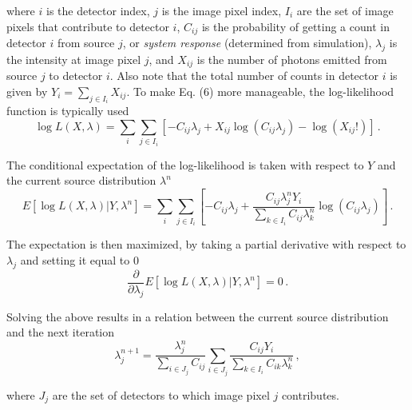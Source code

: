 \documentclass[10pt]{article}
\begin{document}
\noindent where $i$ is the detector index, $j$ is the image pixel index, $I_i$ are the set of image pixels that contribute to detector $i$, $C_{ij}$ is the probability of getting a count in detector $i$ from source $j$, or \emph{system response} (determined from simulation), $\lambda_j$ is the intensity at image pixel $j$, and $X_{ij}$ is the number of photons emitted from source $j$ to detector $i$. Also note that the total number of counts in detector $i$ is given by $Y_i=\sum_{j \in I_i} X_{ij}$. To make Eq. (6) more manageable, the log-likelihood function is typically used
%
\begin{equation} \tag{B.3}
	\log L(X,\lambda) = \sum_i \sum_{j \in I_i} \left[ -C_{ij} \lambda_j + X_{ij} \log (C_{ij} \lambda_j) - \log (X_{ij}!) \right]\,.
\end{equation}

\noindent The conditional expectation of the log-likelihood is taken with respect to $Y$ and the current source distribution $\lambda^n$
%
\begin{equation} \tag{B.4}
	E[\log L(X,\lambda) | Y,\lambda^n] = \sum_i \sum_{j \in I_i} \left[   -C_{ij} \lambda_j + \frac{C_{ij}\lambda_j^n Y_i}{\sum_{k \in I_i}C_{ij}\lambda_k^n }   \log (C_{ij} \lambda_j)   \right]\,.
\end{equation}

\noindent The expectation is then maximized, by taking a partial derivative with respect to $\lambda_j$ and setting it equal to 0
 \begin{equation} \tag{B.5}
	\frac{\partial}{\partial \lambda_j} E[\log L(X,\lambda) | Y,\lambda^n] = 0\,.
\end{equation}

\noindent Solving the above results in a relation between the current source distribution and the next iteration
%
 \begin{equation} \tag{B.6}
	\lambda_j^{n+1} = \frac{\lambda_j^n}{\sum\limits_{i \in J_j}C_{ij}} \sum_{i \in J_j} \frac{C_{ij}Y_i}{\sum\limits_{k \in I_i}C_{ik}\lambda_k^n}\,,
\end{equation}

\noindent where $J_j$ are the set of detectors to which image pixel $j$ contributes.









\end{document}
